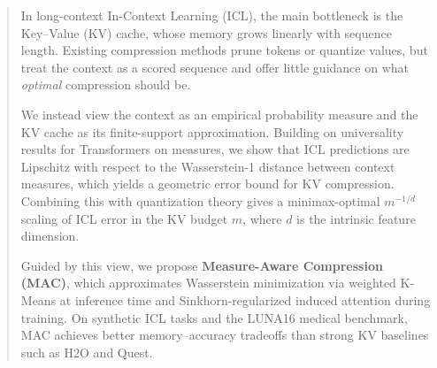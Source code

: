 \documentclass{article}
\theoremstyle{plain}
\theoremstyle{definition}
\theoremstyle{remark}
\begin{document}
\printAffiliationsAndNotice{\icmlEqualContribution} 
\vskip 0.3in

\begin{abstract}
In long-context In-Context Learning (ICL), the main bottleneck is the Key--Value (KV) cache, whose memory grows linearly with sequence length. Existing compression methods prune tokens or quantize values, but treat the context as a scored sequence and offer little guidance on what \emph{optimal} compression should be.

We instead view the context as an empirical probability measure and the KV cache as its finite-support approximation. Building on universality results for Transformers on measures, we show that ICL predictions are Lipschitz with respect to the Wasserstein-1 distance between context measures, which yields a geometric error bound for KV compression. Combining this with quantization theory gives a minimax-optimal $m^{-1/d}$ scaling of ICL error in the KV budget $m$, where $d$ is the intrinsic feature dimension.

Guided by this view, we propose \textbf{Measure-Aware Compression (MAC)}, which approximates Wasserstein minimization via weighted K-Means at inference time and Sinkhorn-regularized induced attention during training. On synthetic ICL tasks and the LUNA16 medical benchmark, MAC achieves better memory--accuracy tradeoffs than strong KV baselines such as H2O and Quest.
\end{abstract}
\end{document}
